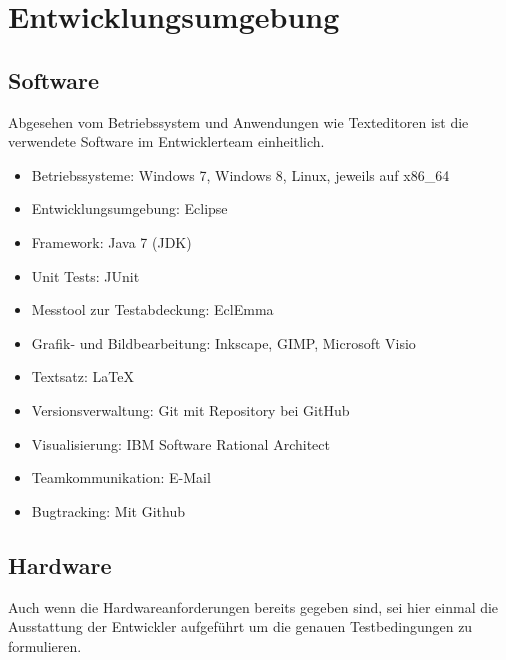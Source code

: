 \documentclass[10pt]{scrreprt}
\begin{document}
\chapter{Entwicklungsumgebung}
\section{Software}
Abgesehen vom Betriebssystem und Anwendungen wie Texteditoren ist die verwendete Software im Entwicklerteam einheitlich.
\begin{itemize}
\item Betriebssysteme: Windows 7, Windows 8, Linux, jeweils auf x86{\_}64
\item Entwicklungsumgebung: Eclipse
\item Framework: Java 7 (JDK)
\item Unit Tests: JUnit
\item Messtool zur Testabdeckung: EclEmma
\item Grafik- und Bildbearbeitung: Inkscape, GIMP, Microsoft Visio
\item Textsatz: \LaTeX
\item Versionsverwaltung: Git mit Repository bei GitHub
\item Visualisierung: IBM Software Rational Architect
\item Teamkommunikation: E-Mail
\item Bugtracking: Mit Github
\end{itemize}

\vspace{5mm}
\section{Hardware}
Auch wenn die Hardwareanforderungen bereits gegeben sind, sei hier einmal die Ausstattung der Entwickler aufgeführt um die genauen Testbedingungen zu formulieren.

\vspace{0.5cm}
\end{document}
